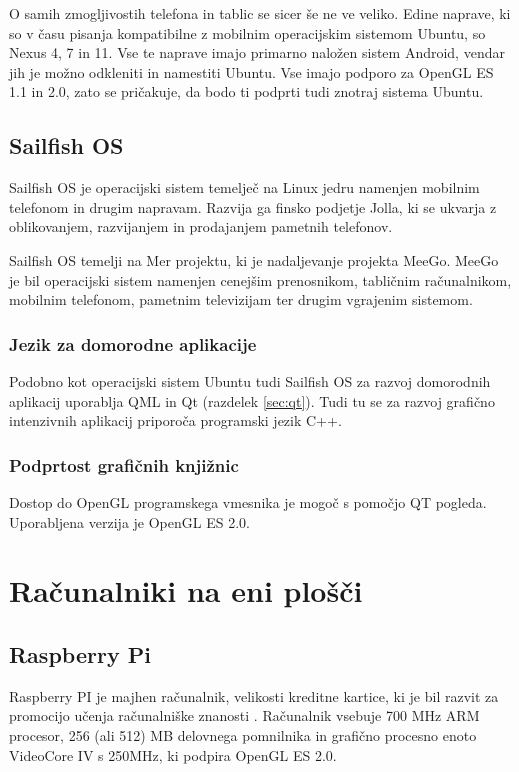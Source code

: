 O samih zmogljivostih telefona in tablic se sicer še ne ve veliko. Edine naprave, ki so v času pisanja kompatibilne z mobilnim operacijskim sistemom Ubuntu, so Nexus 4, 7 in 11. Vse te naprave imajo primarno naložen sistem Android, vendar jih je možno odkleniti in namestiti Ubuntu. Vse imajo podporo za OpenGL ES 1.1 in 2.0, zato se pričakuje, da bodo ti podprti tudi znotraj sistema Ubuntu.

\subsection{Sailfish OS}

Sailfish OS \cite{sailfishos} je operacijski sistem temelječ na Linux jedru namenjen mobilnim telefonom in drugim napravam. Razvija ga finsko podjetje Jolla, ki se ukvarja z oblikovanjem, razvijanjem in prodajanjem pametnih telefonov.

Sailfish OS temelji na Mer projektu, ki je nadaljevanje projekta MeeGo. MeeGo je bil operacijski sistem namenjen cenejšim prenosnikom, tabličnim računalnikom, mobilnim telefonom, pametnim televizijam ter drugim vgrajenim sistemom. 

\subsubsection{Jezik za domorodne aplikacije}

Podobno kot operacijski sistem Ubuntu tudi Sailfish OS za razvoj domorodnih aplikacij uporablja QML in Qt (razdelek \ref{sec:qt}). Tudi tu se za razvoj grafično intenzivnih aplikacij priporoča programski jezik C++.

\subsubsection{Podprtost grafičnih knjižnic}

Dostop do OpenGL programskega vmesnika je mogoč s pomočjo QT pogleda. Uporabljena verzija je OpenGL ES 2.0.

\section{Računalniki na eni plošči}

\subsection{Raspberry Pi}
\label{sec:raspberryPi}

Raspberry PI je majhen računalnik, velikosti kreditne kartice, ki je bil razvit za promocijo učenja računalniške znanosti \cite{rasPi}. Računalnik vsebuje 700 MHz ARM procesor, 256 (ali 512) MB delovnega pomnilnika in grafično procesno enoto VideoCore IV s 250MHz, ki podpira OpenGL ES 2.0.

